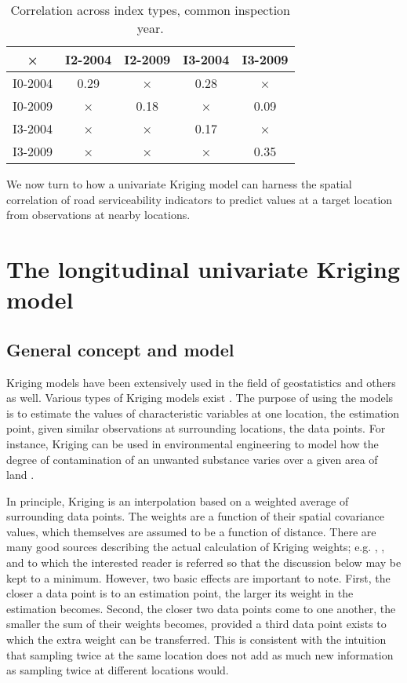 \documentclass[Journal]{ascelike}
\begin{document}
\begin{table}
\begin{center}
\caption{Correlation across index types, common inspection year.}
\label{table2}
\begin{tabular}{c|cccc}\hline
\textbf{×} & I2-2004 & I2-2009 & I3-2004 & I3-2009\\\hline
I0-2004 & 0.29 & × & 0.28 & ×\\
I0-2009 & × & 0.18 & × & 0.09\\
I3-2004 & × & × & 0.17 & ×\\
I3-2009 & × & × & × & 0.35\\\hline
\end{tabular}
\end{center}
\end{table}

We now turn to how a univariate Kriging model can harness the spatial correlation of road serviceability indicators to 
predict values at a target location from observations at nearby locations.
\section{The longitudinal univariate Kriging model} \label{krigmodel}
\subsection{General concept and model} \label{krigmodel1}
Kriging models have been extensively used in the field of geostatistics and others as well.
Various types of Kriging models exist \cite{Wackernagel1998}. The purpose of using the models
is to estimate the values of characteristic variables at one location, the estimation point, given
similar observations at surrounding locations, the data points. For instance, Kriging can be
used in environmental engineering to model how the degree of contamination of an unwanted
substance varies over a given area of land \cite{Cattle2002}.

In principle, Kriging is an interpolation based on a weighted average of surrounding data
points. The weights are a function of their spatial covariance values, which themselves are
assumed to be a function of distance. There are many good sources describing the actual
calculation of Kriging weights; e.g. , , and 
to which the interested reader is referred so that the discussion below may be kept to a
minimum. However, two basic effects are important to note. First, the closer a data point is to
an estimation point, the larger its weight in the estimation becomes. Second, the closer two
data points come to one another, the smaller the sum of their weights becomes, provided a
third data point exists to which the extra weight can be transferred. This is consistent with the
intuition that sampling twice at the same location does not add as much new information as
sampling twice at different locations would.
\end{document}
